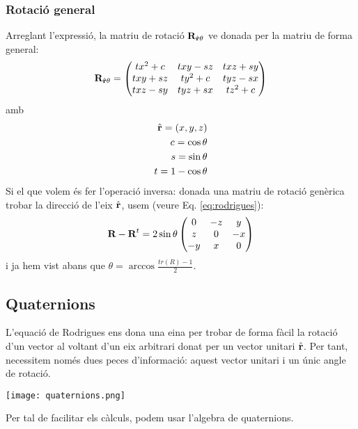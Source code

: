 \documentclass{beamer}
\begin{document}
\begin{frame}[allowframebreaks]
  \frametitle{Rotació general}
  Arreglant l'expressió, la matriu de rotació $\textbf{R}_{\hat{\textbf{r}}\theta}$ ve donada per la matriu de forma general:
  \[
  \textbf{R}_{\hat{\textbf{r}}\theta}=
  \begin{pmatrix}
  tx^2 +c & txy-sz & txz+sy \\
  txy + sz & ty^2+c & tyz-sx \\
  txz-sy & tyz+sx & tz^2+c
  \end{pmatrix}
  \]
  amb
  \begin{eqnarray*}
    \hat{\textbf{r}}=(x,y,z)\\
    c=\cos{\theta}\\
    s=\sin{\theta}\\
    t=1-\cos{\theta}
  \end{eqnarray*}
  Si el que volem és fer l'operació inversa: donada una matriu de rotació genèrica trobar la direcció de l'eix $\hat{\textbf{r}}$, usem (veure Eq. \ref{eq:rodrigues}):
  \[
    \textbf{R}-\textbf{R}^t=2\sin{\theta}\begin{pmatrix}0&-z&y\\z&0&-x\\-y&x&0\end{pmatrix}
  \]
  i ja hem vist abans que $\theta = \arccos{\frac{tr(R)-1}{2}}$.
\end{frame}

\subsection{Quaternions}

\begin{frame}
  L'equació de Rodrigues ens dona una eina per trobar de forma fàcil la rotació d'un vector al voltant d'un eix arbitrari donat per un vector unitari $\hat{\textbf{r}}$. Per tant, necessitem només dues peces d'informació: aquest vector unitari i un únic angle de rotació.

  \begin{center}
    \texttt{[image: quaternions.png]}
  \end{center}

  Per tal de facilitar els càlculs, podem usar l'algebra de quaternions.
\end{frame}
\end{document}
